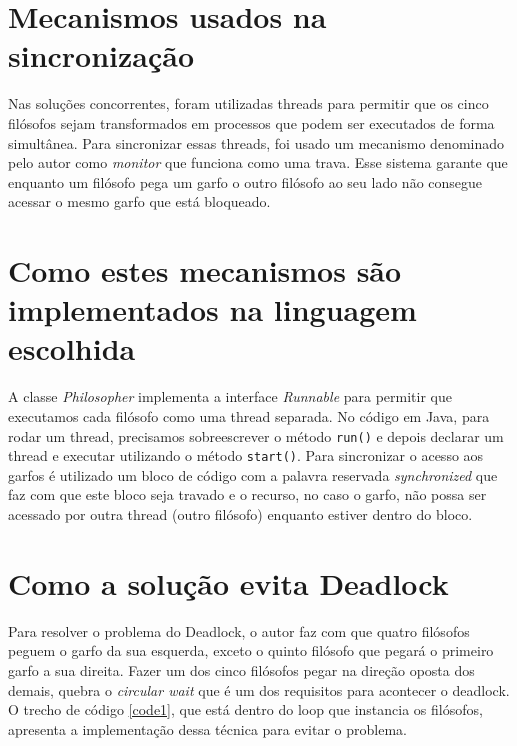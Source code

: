 \documentclass[conference]{IEEEtran}
\begin{document}
\section{Mecanismos usados na sincronização}
Nas soluções concorrentes, foram utilizadas threads para permitir que os cinco filósofos sejam transformados em processos que podem ser executados de forma simultânea.
Para sincronizar essas threads, foi usado um mecanismo denominado pelo autor como \textit{monitor}\cite{baeldung_java} que funciona como uma trava.
Esse sistema garante que enquanto um filósofo pega um garfo o outro filósofo ao seu lado não consegue acessar o mesmo garfo que está bloqueado.

\section{Como estes mecanismos são implementados na linguagem escolhida}

A classe \textit{Philosopher} implementa a interface \textit{Runnable} para permitir que executamos cada filósofo como uma thread separada.
No código em Java, para rodar um thread, precisamos sobreescrever o método \verb|run()| e depois declarar um thread e executar utilizando o método \verb|start()|.
Para sincronizar o acesso aos garfos é utilizado um bloco de código com a palavra reservada \textit{synchronized} que faz com que este bloco seja travado e o recurso, no caso o garfo, não possa ser acessado por outra thread (outro filósofo) enquanto estiver dentro do bloco.

\section{Como a solução evita Deadlock}

Para resolver o problema do Deadlock, o autor faz com que quatro filósofos peguem o garfo da sua esquerda, exceto o quinto filósofo que pegará o primeiro garfo a sua direita.
Fazer um dos cinco filósofos pegar na direção oposta dos demais, quebra o \textit{circular wait} que é um dos requisitos para acontecer o deadlock\cite{baeldung_java}.
O trecho de código \ref{code1}, que está dentro do loop que instancia os filósofos, apresenta a implementação dessa técnica para evitar o problema.



\end{document}
